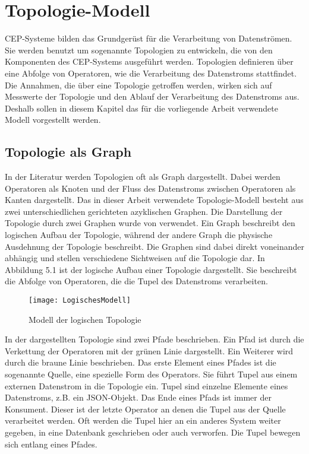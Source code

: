 \chapter{Topologie-Modell}

CEP-Systeme bilden das Grundgerüst für die Verarbeitung von Datenströmen.
Sie werden benutzt um sogenannte Topologien zu entwickeln, die von den Komponenten des CEP-Systems ausgeführt werden.
Topologien definieren über eine Abfolge von Operatoren, wie die Verarbeitung des Datenstroms stattfindet.
Die Annahmen, die über eine Topologie getroffen werden, wirken sich auf Messwerte der Topologie und den Ablauf der Verarbeitung des Datenstroms aus.
Deshalb sollen in diesem Kapitel das für die vorliegende Arbeit verwendete Modell vorgestellt werden.

\section{Topologie als Graph}

In der Literatur werden Topologien oft als Graph dargestellt.
Dabei werden Operatoren als Knoten und der Fluss des Datenstroms zwischen Operatoren als Kanten dargestellt.
Das in dieser Arbeit verwendete Topologie-Modell besteht aus zwei unterschiedlichen gerichteten azyklischen Graphen.
Die Darstellung der Topologie durch zwei Graphen wurde von \cite{lohrmann_elastic_2015} verwendet.
Ein Graph beschreibt den logischen Aufbau der Topologie, während der andere Graph die physische Ausdehnung der Topologie beschreibt.
Die Graphen sind dabei direkt voneinander abhängig und stellen verschiedene Sichtweisen auf die Topologie dar.
In Abbildung 5.1 ist der logische Aufbau einer Topologie dargestellt. 
Sie beschreibt die Abfolge von Operatoren, die die Tupel des Datenstroms verarbeiten.

\begin{figure}
\texttt{[image: LogischesModell]}
\caption{Modell der logischen Topologie}
\end{figure}

In der dargestellten Topologie sind zwei Pfade beschrieben.
Ein Pfad ist durch die Verkettung der Operatoren mit der grünen Linie dargestellt.
Ein Weiterer wird durch die braune Linie beschrieben.
Das erste Element eines Pfades ist die sogenannte Quelle, eine spezielle Form des Operators.
Sie führt Tupel aus einem externen Datenstrom in die Topologie ein.
Tupel sind einzelne Elemente eines Datenstroms, z.B. ein JSON-Objekt.
Das Ende eines Pfads ist immer der Konsument.
Dieser ist der letzte Operator an denen die Tupel aus der Quelle verarbeitet werden. 
Oft werden die Tupel hier an ein anderes System weiter gegeben, in eine Datenbank geschrieben oder auch verworfen.
Die Tupel bewegen sich entlang eines Pfades.

